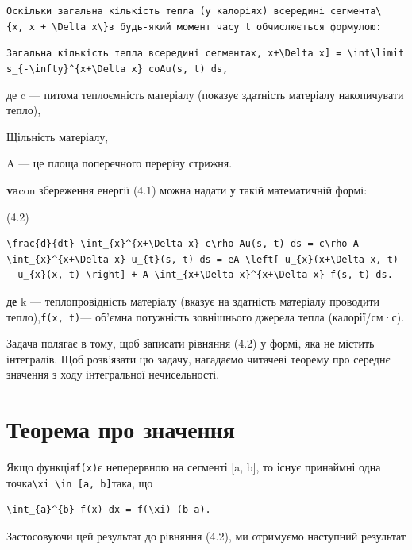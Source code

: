 \documentclass[
  ukrainian,
]{article}
\begin{document}
\texttt{Оскільки\ загальна\ кількість\ тепла\ (у\ калоріях)\ всередині\ сегмента\textquotesingle{}\textbackslash{}\{x,\ x\ +\ \textbackslash{}Delta\ x\textbackslash{}\}\textquotesingle{}в\ будь-який\ момент\ часу\ t\ обчислюється\ формулою:}

\texttt{Загальна\ кількість\ тепла\ всередині\ сегмента\textquotesingle{}{[}x,\ x+\textbackslash{}Delta\ x{]}\ =\ \textbackslash{}int\textbackslash{}limits\_\{-\textbackslash{}infty\}\^{}\{x+\textbackslash{}Delta\ x\}\ coAu\textquotesingle{}(s,\ t)\ ds,}

де c --- питома теплоємність матеріалу (показує здатність матеріалу
накопичувати тепло),

Щільність матеріалу,

A --- це площа поперечного перерізу стрижня.

\textbf{va}con збереження енергії (4.1) можна надати у такій
математичній формі:

(4.2)

\begin{verbatim}
\frac{d}{dt} \int_{x}^{x+\Delta x} c\rho Au(s, t) ds = c\rho A \int_{x}^{x+\Delta x} u_{t}(s, t) ds = eA \left[ u_{x}(x+\Delta x, t) - u_{x}(x, t) \right] + A \int_{x+\Delta x}^{x+\Delta x} f(s, t) ds.
\end{verbatim}

\textbf{де} k --- теплопровідність матеріалу (вказує на здатність
матеріалу проводити тепло),\texttt{f(x,\ t)}--- об'ємна потужність
зовнішнього джерела тепла (калорії/см·с).

Задача полягає в тому, щоб записати рівняння (4.2) у формі, яка не
містить інтегралів. Щоб розв'язати цю задачу, нагадаємо читачеві теорему
про середнє значення з ходу інтегральної нечисельності.

\section{Теорема про
значення}\label{ux442ux435ux43eux440ux435ux43cux430-ux43fux440ux43e-ux437ux43dux430ux447ux435ux43dux43dux44f}

Якщо функція\texttt{f(x)}є неперервною на сегменті {[}a, b{]}, то існує
принаймні одна
точка\texttt{\textbackslash{}xi\ \textbackslash{}in\ {[}a,\ b{]}}така,
що

\begin{verbatim}
\int_{a}^{b} f(x) dx = f(\xi) (b-a).
\end{verbatim}

Застосовуючи цей результат до рівняння (4.2), ми отримуємо наступний
результат
\end{document}
